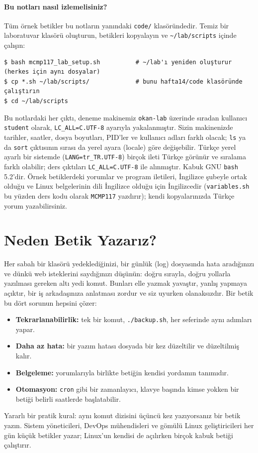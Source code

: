 \documentclass[11pt,a4paper]{article}
\newcommand{\cmd}[1]{\texttt{#1}}
\begin{document}
\paragraph{Bu notları nasıl izlemelisiniz?} Tüm örnek betikler bu notların yanındaki \texttt{code/} klasöründedir. Temiz bir laboratuvar klasörü oluşturun, betikleri kopyalayın ve \texttt{\textasciitilde/lab/scripts} içinde çalışın:
\begin{lstlisting}[style=term]
$ bash mcmp117_lab_setup.sh          # ~/lab'ı yeniden oluşturur (herkes için aynı dosyalar)
$ cp *.sh ~/lab/scripts/             # bunu hafta14/code klasöründe çalıştırın
$ cd ~/lab/scripts
\end{lstlisting}
Bu notlardaki her çıktı, deneme makinemiz \texttt{okan-lab} üzerinde sıradan kullanıcı \texttt{student} olarak, \texttt{LC\_ALL=C.UTF-8} ayarıyla yakalanmıştır. Sizin makinenizde tarihler, saatler, dosya boyutları, PID'ler ve kullanıcı adları farklı olacak; \cmd{ls} ya da \cmd{sort} çıktısının sırası da yerel ayara (locale) göre değişebilir. Türkçe yerel ayarlı bir sistemde (\texttt{LANG=tr\_TR.UTF-8}) birçok ileti Türkçe görünür ve sıralama farklı olabilir; ders çıktıları \texttt{LC\_ALL=C.UTF-8} ile alınmıştır. Kabuk GNU \texttt{bash} 5.2'dir. Örnek betiklerdeki yorumlar ve program iletileri, İngilizce şubeyle ortak olduğu ve Linux belgelerinin dili İngilizce olduğu için İngilizcedir (\texttt{variables.sh} bu yüzden ders kodu olarak \texttt{MCMP117} yazdırır); kendi kopyalarınızda Türkçe yorum yazabilirsiniz.

\section{Neden Betik Yazarız?}

Her sabah bir klasörü yedeklediğinizi, bir günlük (log) dosyasında hata aradığınızı ve dünkü web isteklerini saydığınızı düşünün: doğru sırayla, doğru yollarla yazılması gereken altı yedi komut. Bunları elle yazmak yavaştır, yanlış yapmaya açıktır, bir iş arkadaşınıza anlatması zordur ve siz uyurken olanaksızdır. Bir betik bu dört sorunun hepsini çözer:
\begin{itemize}
  \item \textbf{Tekrarlanabilirlik:} tek bir komut, \texttt{./backup.sh}, her seferinde aynı adımları yapar.
  \item \textbf{Daha az hata:} bir yazım hatası dosyada bir kez düzeltilir ve düzeltilmiş kalır.
  \item \textbf{Belgeleme:} yorumlarıyla birlikte betiğin kendisi yordamın tanımıdır.
  \item \textbf{Otomasyon:} \cmd{cron} gibi bir zamanlayıcı, klavye başında kimse yokken bir betiği belirli saatlerde başlatabilir.
\end{itemize}
Yararlı bir pratik kural: aynı komut dizisini üçüncü kez yazıyorsanız bir betik yazın. Sistem yöneticileri, DevOps mühendisleri ve gömülü Linux geliştiricileri her gün küçük betikler yazar; Linux'un kendisi de açılırken birçok kabuk betiği çalıştırır.
\end{document}
